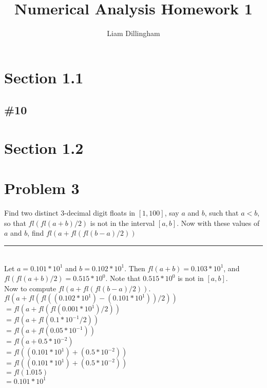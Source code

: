\documentclass[20pt]{article} %
\title{Numerical Analysis Homework 1}
\author{Liam Dillingham}
\begin{document}
\maketitle

\section{Section 1.1}
\subsection{\#10}

\section{Section 1.2}
\subsection{}

\section{}

\section{Problem 3}
Find two distinct 3-decimal digit floats in $[1,100]$, say $a$ and $b$, such that $a < b$, so that $fl(fl(a+b)/2)$ is not in the interval $[a,b]$. Now with these values of $a$ and $b$, find $fl(a+fl(fl(b-a)/2))$
\noindent\rule{2cm}{0.4pt} \\

Let $a = 0.101 * 10^{1}$ and $b = 0.102 * 10^{1}$. Then $fl(a+b) = 0.103 * 10^{1}$, and $fl(fl(a+b)/2) = 0.515 * 10^{0}$.  Note that $0.515 * 10^{0}$ is not in $[a,b]$.\\
Now to compute $fl(a+fl(fl(b-a)/2))$. \\
$fl(a+ fl(fl((0.102 * 10^{1}) - ( 0.101 * 10^{1}))/2))$ \\
$=fl(a+ fl(fl(0.001*10^{1})/2))$ \\
$=fl(a+ fl(0.1*10^{-1}/2))$ \\
$=fl(a+ fl(0.05*10^{-1}))$ \\
$=fl(a+ 0.5*10^{-2})$ \\
$=fl((0.101*10^{1})+ (0.5*10^{-2}))$ \\
$=fl((0.101*10^{1})+ (0.5*10^{-2}))$ \\
$=fl(1.015)$ \\
$=0.101*10^{1}$ \\
\end{document}
